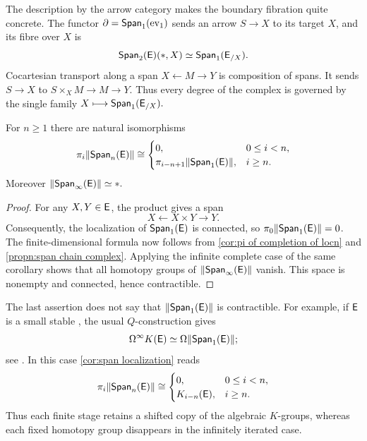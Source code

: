 \documentclass[a4paper,11pt]{article}
\begin{document}
\begin{remark}\label{rmk:span boundary fibration}
  The description by the arrow category makes the boundary fibration
  quite concrete.  The functor $\partial=\textup{\textsf{Span}}_1(\text{\textup{ev}}_1)$ sends an
  arrow $S\to X$ to its target $X$, and its fibre over $X$ is
  \[
    \textup{\textsf{Span}}_2(\textup{\textsf{E}})(*,X)\simeq\textup{\textsf{Span}}_1(\textup{\textsf{E}}_{/X}).
  \]
  Cocartesian transport along a span
  $X\xleftarrow{}M\xrightarrow{}Y$ is composition of spans. It sends
  $S\to X$ to
  $
    S\times_XM\longrightarrow M\longrightarrow Y.
  $
  Thus every degree of the complex is governed by the single family
  $
    X\longmapsto\textup{\textsf{Span}}_1(\textup{\textsf{E}}_{/X}).
  $
\end{remark}

\begin{cor}\label{cor:span localization}
  For $n\geq1$ there are natural isomorphisms
  \[
    \pi_i\|\textup{\textsf{Span}}_n(\textup{\textsf{E}})\|\cong
    \begin{cases}
      0, & 0\leq i<n,\\
      \pi_{i-n+1}\|\textup{\textsf{Span}}_1(\textup{\textsf{E}})\|, & i\geq n.
    \end{cases}
  \]
  Moreover $
    \|\textup{\textsf{Span}}_{\infty}(\textup{\textsf{E}})\|\simeq *.$
\end{cor}

\begin{proof}
  For any $X,Y\in\textup{\textsf{E}}$, the product gives a span
  \[
    X\longleftarrow X\times Y\longrightarrow Y.
  \]
  Consequently, the localization of $\textup{\textsf{Span}}_1(\textup{\textsf{E}})$ is connected, so
  $\pi_0\|\textup{\textsf{Span}}_1(\textup{\textsf{E}})\|=0$.  The finite-dimensional formula now
  follows from \cref{cor:pi of completion of locn} and
  \cref{propn:span chain complex}.  Applying the infinite complete
  case of the same corollary shows that all homotopy groups of
  $\|\textup{\textsf{Span}}_{\infty}(\textup{\textsf{E}})\|$ vanish.  This space is nonempty and
  connected, hence contractible.
\end{proof}

\begin{remark}
  The last assertion does not say that
  $\|\textup{\textsf{Span}}_1(\textup{\textsf{E}})\|$ is contractible.  For example, if $\textup{\textsf{E}}$ is a
  small stable \icat{}, the usual $Q$-construction gives
  \[
    \Omega^\infty K(\textup{\textsf{E}})\simeq\Omega\|\textup{\textsf{Span}}_1(\textup{\textsf{E}})\|;
  \]
  see \cite[Example~2.3.3(iii) and Observation~2.3.11]{CalmesEtAlII}.
  In this case \cref{cor:span localization} reads
  \[
    \pi_i\|\textup{\textsf{Span}}_n(\textup{\textsf{E}})\|\cong
    \begin{cases}
      0, & 0\leq i<n,\\
      K_{i-n}(\textup{\textsf{E}}), & i\geq n.
    \end{cases}
  \]
  Thus each finite stage retains a shifted copy of the algebraic
  $K$-groups, whereas each fixed homotopy group disappears in the
  infinitely iterated case.
\end{remark}





\begin{bibdiv}
\begin{biblist}
\end{biblist}
\end{bibdiv}
\end{document}
